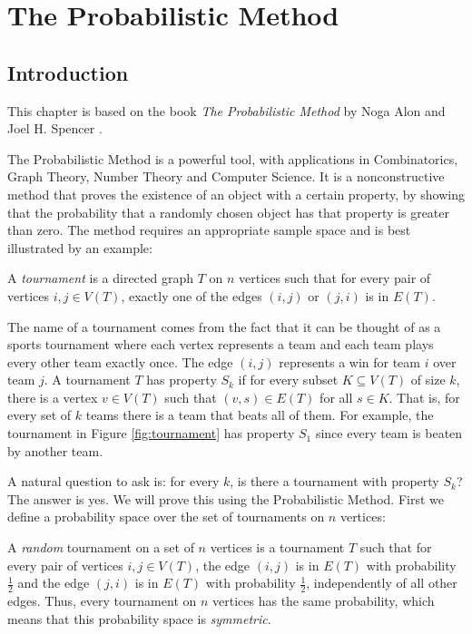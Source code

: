 \chapter{The Probabilistic Method}\label{chap:probmet}

\section{Introduction}\label{sec:probmet:intro}

This chapter is based on the book \textit{The Probabilistic Method} by Noga Alon and Joel H. Spencer \cite{alon2016probabilistic}. \par

The Probabilistic Method is a powerful tool, with applications in Combinatorics, Graph Theory, Number Theory and Computer Science. It is a nonconstructive method that proves the existence of an object with a certain property, by showing that the probability that a randomly chosen object has that property is greater than zero. The method requires an appropriate sample space and is best illustrated by an example: \par

\begin{definition}\label{def:tournament} 
A \textit{tournament} is a directed graph $T$ on $n$ vertices such that for every pair of vertices $i, j \in V(T)$, exactly one of the edges $(i, j)$ or $(j, i)$ is in $E(T)$. 
\end{definition}

The name of a tournament comes from the fact that it can be thought of as a sports tournament where each vertex represents a team and each team plays every other team exactly once. The edge $(i, j)$ represents a win for team $i$ over team $j$. A tournament $T$ has property $S_k$ if for every subset $K \subseteq V(T)$ of size $k$, there is a vertex $v \in V(T)$ such that $(v, s) \in E(T)$ for all $s \in K$. That is, for every set of $k$ teams there is a team that beats all of them. For example, the tournament in Figure \ref{fig:tournament} has property $S_1$ since every team is beaten by another team. \par

A natural question to ask is: for every $k$, is there a tournament with property $S_k$? The answer is yes. We will prove this using the Probabilistic Method. First we define a probability space over the set of tournaments on $n$ vertices: \par 
A \textit{random} tournament on a set of $n$ vertices is a tournament $T$ such that for every pair of vertices $i, j \in V(T)$, the edge $(i, j)$ is in $E(T)$ with probability $\frac{1}{2}$ and the edge $(j, i)$ is in $E(T)$ with probability $\frac{1}{2}$, independently of all other edges. Thus, every tournament on $n$ vertices has the same probability, which means that this probability space is \textit{symmetric}. \par

